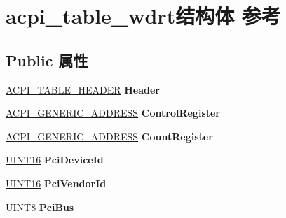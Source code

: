 \hypertarget{structacpi__table__wdrt}{}\section{acpi\+\_\+table\+\_\+wdrt结构体 参考}
\label{structacpi__table__wdrt}
\subsection*{Public 属性}
\begin{DoxyCompactItemize}
\item 
\mbox{\label{structacpi__table__wdrt_a0d66ca3cc846cfbc4c365844076c7f5c}} 
\hyperlink{structacpi__table__header}{A\+C\+P\+I\+\_\+\+T\+A\+B\+L\+E\+\_\+\+H\+E\+A\+D\+ER} {\bfseries Header}
\item 
\mbox{\label{structacpi__table__wdrt_a6f5ec3733291af45138144dfd590024c}} 
\hyperlink{structacpi__generic__address}{A\+C\+P\+I\+\_\+\+G\+E\+N\+E\+R\+I\+C\+\_\+\+A\+D\+D\+R\+E\+SS} {\bfseries Control\+Register}
\item 
\mbox{\label{structacpi__table__wdrt_a9dbd7978f2072a2da47900d3349f452b}} 
\hyperlink{structacpi__generic__address}{A\+C\+P\+I\+\_\+\+G\+E\+N\+E\+R\+I\+C\+\_\+\+A\+D\+D\+R\+E\+SS} {\bfseries Count\+Register}
\item 
\mbox{\label{structacpi__table__wdrt_a3f08e025e94c375558553ef05d507878}} 
\hyperlink{_processor_bind_8h_a09f1a1fb2293e33483cc8d44aefb1eb1}{U\+I\+N\+T16} {\bfseries Pci\+Device\+Id}
\item 
\mbox{\label{structacpi__table__wdrt_acdd9c0f963e22308ae69efb480851b9b}} 
\hyperlink{_processor_bind_8h_a09f1a1fb2293e33483cc8d44aefb1eb1}{U\+I\+N\+T16} {\bfseries Pci\+Vendor\+Id}
\item 
\mbox{\label{structacpi__table__wdrt_a869dd7b9a326d2686dcfb35bc525f385}} 
\hyperlink{_processor_bind_8h_ab27e9918b538ce9d8ca692479b375b6a}{U\+I\+N\+T8} {\bfseries Pci\+Bus}
\item 
\mbox{\label{structacpi__table__wdrt_a4f2f12a8a7fbeaeaab1d021466a05746}} 

\end{DoxyCompactItemize}
